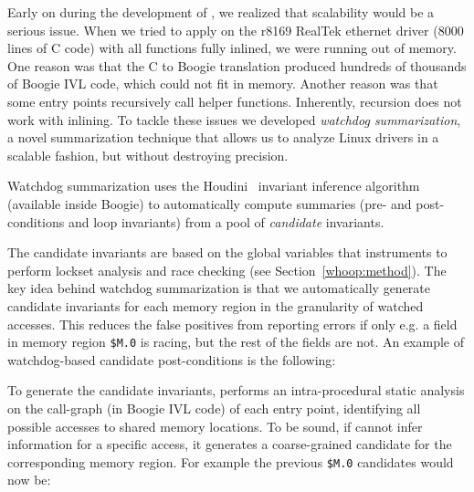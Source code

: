 Early on during the development of \whoop, we realized that scalability would be a serious issue. When we tried to apply \whoop on the r8169 RealTek ethernet driver (8000 lines of C code) with all functions fully inlined, we were running out of memory. One reason was that the C to Boogie translation produced hundreds of thousands of Boogie IVL code, which could not fit in memory. Another reason was that some entry points recursively call helper functions. Inherently, recursion does not work with inlining. To tackle these issues we developed \emph{watchdog summarization}, a novel summarization technique that allows us to analyze Linux drivers in a scalable fashion, but without destroying precision.

Watchdog summarization uses the Houdini~\cite{flanagan2001houdini} invariant inference algorithm (available inside Boogie) to automatically compute summaries (pre- and post-conditions and loop invariants) from a pool of \emph{candidate} invariants.

The candidate invariants are based on the global variables that \whoop instruments to perform lockset analysis and race checking (see Section~\ref{whoop:method}). The key idea behind watchdog summarization is that we automatically generate candidate invariants for each memory region in the granularity of watched accesses. This reduces the false positives from reporting errors if only e.g. a field in memory region \texttt{\$M.0} is racing, but the rest of the fields are not. An example of watchdog-based candidate post-conditions is the following:


To generate the candidate invariants, \whoop performs an intra-procedural static analysis on the call-graph (in Boogie IVL code) of each entry point, identifying all possible accesses to shared memory locations. To be sound, if \whoop cannot infer information for a specific access, it generates a coarse-grained candidate for the corresponding memory region. For example the previous \texttt{\$M.0} candidates would now be:

